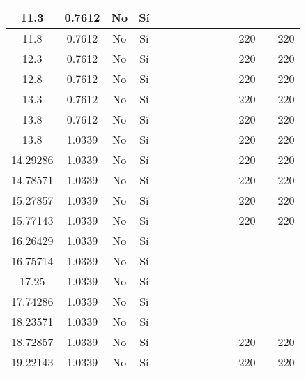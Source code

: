 \begin{table}[H]
{\begin{tabular}{|c|c|c|c|c|c|c|c|c|c|c|c|c|c|}
11.3 & 0.7612 & No  & Sí  &     &     &     &     &     &     &     &     &     &  \bigstrut\\
\hline
11.8 & 0.7612 & No  & Sí  &     &     &     &     &     &     &     & 220 &     & 220 \bigstrut\\
\hline
12.3 & 0.7612 & No  & Sí  &     &     &     &     &     &     &     & 220 &     & 220 \bigstrut\\
\hline
12.8 & 0.7612 & No  & Sí  &     &     &     &     &     &     &     & 220 &     & 220 \bigstrut\\
\hline
13.3 & 0.7612 & No  & Sí  &     &     &     &     &     &     &     & 220 &     & 220 \bigstrut\\
\hline
13.8 & 0.7612 & No  & Sí  &     &     &     &     &     &     &     & 220 &     & 220 \bigstrut\\
\hline
13.8 & 1.0339 & No  & Sí  &     &     &     &     &     &     &     & 220 &     & 220 \bigstrut\\
\hline
14.29286 & 1.0339 & No  & Sí  &     &     &     &     &     &     &     & 220 &     & 220 \bigstrut\\
\hline
14.78571 & 1.0339 & No  & Sí  &     &     &     &     &     &     &     & 220 &     & 220 \bigstrut\\
\hline
15.27857 & 1.0339 & No  & Sí  &     &     &     &     &     &     &     & 220 &     & 220 \bigstrut\\
\hline
15.77143 & 1.0339 & No  & Sí  &     &     &     &     &     &     &     & 220 &     & 220 \bigstrut\\
\hline
16.26429 & 1.0339 & No  & Sí  &     &     &     &     &     &     &     &     &     &  \bigstrut\\
\hline
16.75714 & 1.0339 & No  & Sí  &     &     &     &     &     &     &     &     &     &  \bigstrut\\
\hline
17.25 & 1.0339 & No  & Sí  &     &     &     &     &     &     &     &     &     &  \bigstrut\\
\hline
17.74286 & 1.0339 & No  & Sí  &     &     &     &     &     &     &     &     &     &  \bigstrut\\
\hline
18.23571 & 1.0339 & No  & Sí  &     &     &     &     &     &     &     &     &     &  \bigstrut\\
\hline
18.72857 & 1.0339 & No  & Sí  &     &     &     &     &     &     &     & 220 &     & 220 \bigstrut\\
\hline
19.22143 & 1.0339 & No  & Sí  &     &     &     &     &     &     &     & 220 &     & 220 \bigstrut\\

\end{tabular}}
\end{table}
